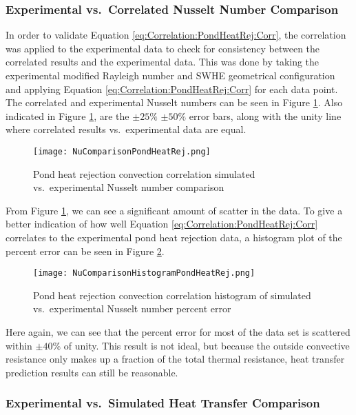 			
\subsubsection{Experimental vs.\ Correlated Nusselt Number Comparison}

In order to validate Equation \ref{eq:Correlation:PondHeatRej:Corr}, the correlation was applied to the experimental data to check for consistency between the correlated results and the experimental data. This was done by taking the experimental modified Rayleigh number and SWHE geometrical configuration and applying Equation \ref{eq:Correlation:PondHeatRej:Corr} for each data point. The correlated and experimental Nusselt numbers can be seen in Figure \ref{fig:Correlation:PondHeatRej:NuComparison}. Also indicated in Figure \ref{fig:Correlation:PondHeatRej:NuComparison}, are the $\pm 25 \%$ $\pm 50 \%$ error bars, along with the unity line where correlated results vs.\ experimental data are equal.

\begin{figure}
	\centering
	\texttt{[image: NuComparisonPondHeatRej.png]}
	\caption{Pond heat rejection convection correlation simulated vs.\ experimental Nusselt number comparison}
	\label{fig:Correlation:PondHeatRej:NuComparison}
\end{figure}

From Figure \ref{fig:Correlation:PondHeatRej:NuComparison}, we can see a significant amount of scatter in the data. To give a better indication of how well Equation \ref{eq:Correlation:PondHeatRej:Corr} correlates to the experimental pond heat rejection data, a histogram plot of the percent error can be seen in Figure \ref{fig:Correlation:PondHeatRej:NuComparisonHistogram}. 		
		
\begin{figure}
	\centering
	\texttt{[image: NuComparisonHistogramPondHeatRej.png]}
	\caption{Pond heat rejection convection correlation histogram of simulated vs.\ experimental Nusselt number percent error}
	\label{fig:Correlation:PondHeatRej:NuComparisonHistogram}
\end{figure}

Here again, we can see that the percent error for most of the data set is scattered within $\pm 40\%$ of unity. This result is not ideal, but because the outside convective resistance only makes up a fraction of the total thermal resistance, heat transfer prediction results can still be reasonable.

		
\subsubsection{Experimental vs.\ Simulated Heat Transfer Comparison}
			
